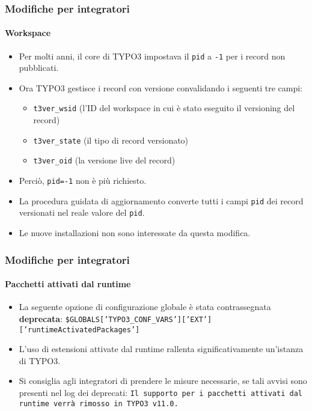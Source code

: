 \begin{frame}[fragile]
	\frametitle{Modifiche per integratori}
	\framesubtitle{Workspace}

	\begin{itemize}
		\item Per molti anni, il core di TYPO3 impostava il \texttt{pid} a \texttt{-1} per i record non pubblicati.
		\item Ora TYPO3 gestisce i record con versione convalidando i seguenti tre campi:

			\begin{itemize}
				\item \texttt{t3ver\_wsid} (l'ID del workspace in cui è stato eseguito il versioning del record)
				\item \texttt{t3ver\_state} (il tipo di record versionato)
				\item \texttt{t3ver\_oid} (la versione live del record)
			\end{itemize}

		\item Perciò, \texttt{pid=-1} non è più richiesto.
		\item La procedura guidata di aggiornamento converte tutti i campi \texttt{pid} dei record versionati
			nel reale valore del \texttt{pid}.
		\item Le nuove installazioni non sono interessate da questa modifica.

	\end{itemize}

\end{frame}


\begin{frame}[fragile]
	\frametitle{Modifiche per integratori}
	\framesubtitle{Pacchetti attivati dal runtime}

	\begin{itemize}
		\item La seguente opzione di configurazione globale è stata contrassegnata \textbf{deprecata}:\newline
			\smaller
				\texttt{\$GLOBALS['TYPO3\_CONF\_VARS']['EXT']['runtimeActivatedPackages']}
			\normalsize
		\item L'uso di estensioni attivate dal runtime rallenta significativamente un'istanza di TYPO3.
		\item Si consiglia agli integratori di prendere le misure necessarie, se tali avvisi sono presenti
			nel log dei deprecati:\newline
			\begingroup
				\fontsize{8}{10}
				\texttt{Il supporto per i pacchetti attivati dal runtime verrà rimosso in TYPO3 v11.0.}
			\endgroup

	\end{itemize}

\end{frame}

